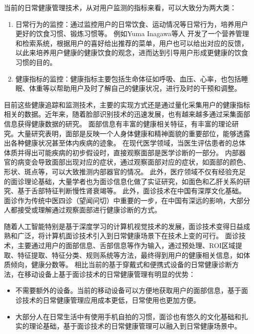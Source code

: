 当前的日常健康管理技术，从对用户监测的指标来看，可以大致分为两大类：

\begin{enumerate}
    \item 日常行为的监控：通过监控用户的日常饮食、运动情况等日常行为，培养用户更好的饮食习惯、锻炼习惯等\cite{purpura2011fit4life,Inagawa2013A,cordeiro2015barriers, miller2014stepstream}。 例如Yuma Inagawa等人\cite{Inagawa2013A} 开发了一个营养管理和检索系统，根据用户的喜好给出推荐的菜单，用户也可以给出对应的反馈，以此来培养用户健康的健康饮食的观念，进而达到引导用户形成更健康的饮食习惯的目的。
    \item 健康指标的监控：健康指标主要包括生命体征如呼吸、血压、心率，也包括睡眠、体重等\cite{kay2012lullaby,gronvall2013beyond,walters2010a}以帮助用户及时了解自己的健康状况，进行及时的干预和调整。
\end{enumerate}

目前这些健康追踪和监测技术，主要的实现方式还是通过量化采集用户的健康指标相关的数据。近年来，随着脸部识别技术的迅速发展，也有越来越多通过采集面部信息获得健康数据的研究。
面部信息有丰富的健康相关特征，有丰富的理论研究。大量研究表明，面部是反映一个人身体健康和精神面貌的重要部位，能够透露出各种健康状况甚至体内疾病的迹象。
在现代医学领域，当医生评估患者的总体体质并得出可能疾病的初步假设时，直接观察面部是医学诊断的一部分\cite{ding2019reading}。
内部器官的病变会导致面部出现对应的症状，通过观察面部对应的症状，如面部的颜色、形状、斑点等，可以大致推测内部器官的情况\cite{汪珺2018六经辨证中自然辩证法三大规律初探}。
此外，医疗领域不仅有经验充足的面诊理论基础，大量学者也为面诊信息化做了实证研究，如面色和乙肝关系的研究\cite{吴秀艳2014108}、基于舌部特征判断慢性肾衰竭\cite{周小芳2018慢性肾衰患者虚兼湿浊证的口唇特征研究}等。
此外，面诊技术在中国有深厚文化基础。面诊作为传统中医四诊（望闻问切）中重要的一步，在中国有深远的影响，大部分人都接受或理解通过观察面部进行健康诊断的方式。


随着人工智能特别是基于深度学习的计算机视觉技术的发展，面诊技术变得日益成熟和广泛，将计算机面诊技术引入到日常健康场景下在技术上变的可行。
面诊技术，主要通过用户的面部信息、舌部信息等作为输入，通过预处理、ROI区域提取、特征提取、特征分类、规则系统等方法，最终得到用户的健康相关信息，如体质倾向，健康分数等\cite{林锋2019中医面诊系统调研报告}。
相比当前的基于穿戴式和便携式设备的日常健康诊断方法，在移动设备上基于面诊技术的日常健康管理有明显的优势：

\begin{itemize}
    \item 不需要额外的设备。当前的移动设备可以方便地获取用户的面部信息，基于面诊技术的日常健康管理应用成本更低，日常使用也更加方便。
    \item 大部分人在日常生活中有使用手机自拍的习惯，面诊也有悠久的文化基础和扎实的理论基础，基于面诊技术的日常健康管理可以融入到日常健康场景中。
\end{itemize}

